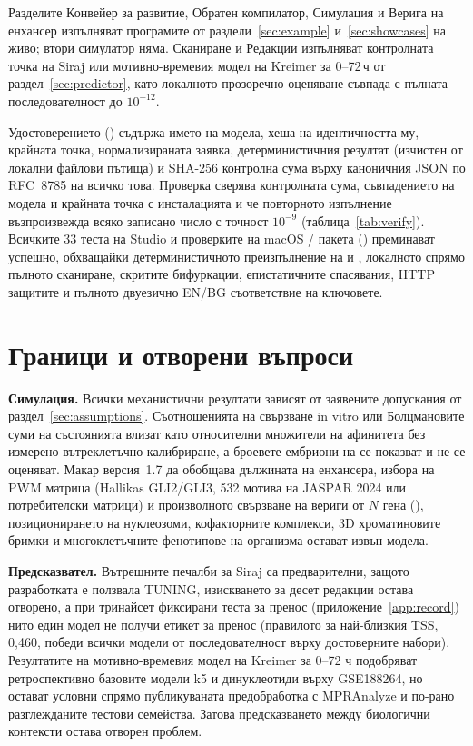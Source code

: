 \documentclass[10.5pt,a4paper]{article}
\begin{document}
Разделите Конвейер за развитие, Обратен компилатор, Симулация и Верига на енхансер изпълняват програмите от раздели~\ref{sec:example} и~\ref{sec:showcases} на живо; втори симулатор няма. Сканиране и Редакции изпълняват контролната точка на Siraj или мотивно-времевия модел на Kreimer за 0--72\,ч от раздел~\ref{sec:predictor}, като локалното прозоречно оценяване съвпада с пълната последователност до $10^{-12}$.

Удостоверението () съдържа името на модела, хеша на идентичността му, крайната точка, нормализираната заявка, детерминистичния резултат (изчистен от локални файлови пътища) и SHA-256 контролна сума върху каноничния JSON по RFC~8785 на всичко това. Проверка сверява контролната сума, съвпадението на модела и крайната точка с инсталацията и че повторното изпълнение възпроизвежда всяко записано число с точност $10^{-9}$ (таблица~\ref{tab:verify}). Всичките 33 теста на Studio и проверките на macOS / пакета () преминават успешно, обхващайки детерминистичното преизпълнение на  и , локалното спрямо пълното сканиране, скритите бифуркации, епистатичните спасявания, HTTP защитите и пълното двуезично EN/BG съответствие на ключовете.

\section{Граници и отворени въпроси}\label{sec:limits}

\textbf{Симулация.} Всички механистични резултати зависят от заявените допускания от раздел~\ref{sec:assumptions}. Съотношенията на свързване in vitro или Болцмановите суми на състоянията влизат като относителни множители на афинитета без измерено вътреклетъчно калибриране, а броевете ембриони на \citet{peterson2012} се показват и не се оценяват. Макар версия~1.7 да обобщава дължината на енхансера, избора на PWM матрица (Hallikas GLI2/GLI3, 532 мотива на JASPAR 2024 или потребителски матрици) и произволното свързване на вериги от $N$ гена (), позиционирането на нуклеозоми, кофакторните комплекси, 3D хроматиновите бримки и многоклетъчните фенотипове на организма остават извън модела.

\textbf{Предсказвател.} Вътрешните печалби за Siraj са предварителни, защото разработката е ползвала TUNING, изискването за десет редакции остава отворено, а при тринайсет фиксирани теста за пренос (приложение~\ref{app:record}) нито един модел не получи етикет за пренос (правилото за най-близкия TSS, 0,460, победи всички модели от последователност върху достоверните набори). Резултатите на мотивно-времевия модел на Kreimer за 0–72 ч подобряват ретроспективно базовите модели k5 и динуклеотиди върху GSE188264, но остават условни спрямо публикуваната предобработка с MPRAnalyze и по-рано разглежданите тестови семейства. Затова предсказването между биологични контексти остава отворен проблем.
\end{document}
